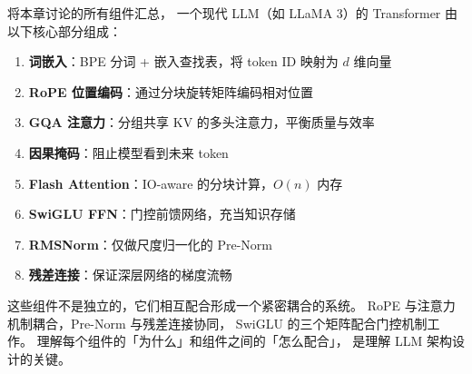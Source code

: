\begin{keybox}
将本章讨论的所有组件汇总，
一个现代 LLM（如 LLaMA 3）的 Transformer 由以下核心部分组成：
\begin{enumerate}[noitemsep]
  \item \textbf{词嵌入}：BPE 分词 + 嵌入查找表，将 token ID 映射为 $d$ 维向量
  \item \textbf{RoPE 位置编码}：通过分块旋转矩阵编码相对位置
  \item \textbf{GQA 注意力}：分组共享 KV 的多头注意力，平衡质量与效率
  \item \textbf{因果掩码}：阻止模型看到未来 token
  \item \textbf{Flash Attention}：IO-aware 的分块计算，$O(n)$ 内存
  \item \textbf{SwiGLU FFN}：门控前馈网络，充当知识存储
  \item \textbf{RMSNorm}：仅做尺度归一化的 Pre-Norm
  \item \textbf{残差连接}：保证深层网络的梯度流畅
\end{enumerate}
这些组件不是独立的，它们相互配合形成一个紧密耦合的系统。
RoPE 与注意力机制耦合，Pre-Norm 与残差连接协同，
SwiGLU 的三个矩阵配合门控机制工作。
理解每个组件的「为什么」和组件之间的「怎么配合」，
是理解 LLM 架构设计的关键。
\end{keybox}

